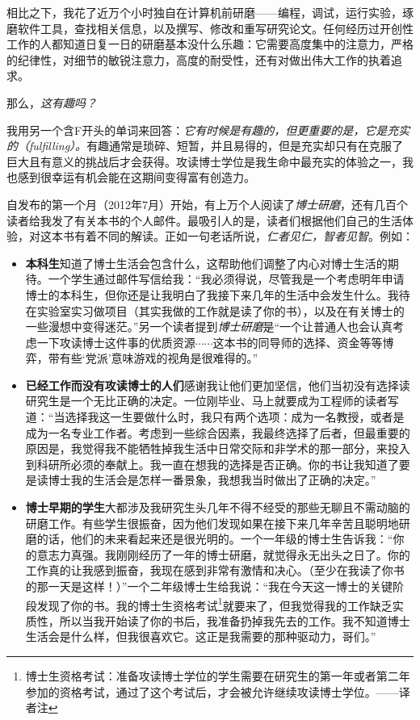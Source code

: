 \documentclass[letter,12pt]{book}
\newcommand{\bookname}{博士研磨}
\begin{document}
\begin{CJK}{UTF8}{gbsn}
相比之下，我花了近万个小时独自在计算机前研磨——编程，调试，运行实验，琢磨软件工具，查找相关信息，以及撰写、修改和重写研究论文。任何经历过开创性工作的人都知道日复一日的研磨基本没什么乐趣：它需要高度集中的注意力，严格的纪律性，对细节的敏锐注意力，高度的耐受性，还有对做出伟大工作的执着追求。

那么，\emph{这有趣吗？}

我用另一个含F开头的单词来回答：\emph{它有时候是有趣的，但更重要的是，它是充实的（fulfilling）。}有趣通常是琐碎、短暂，并且易得的，但是充实却只有在克服了巨大且有意义的挑战后才会获得。攻读博士学位是我生命中最充实的体验之一，我也感到很幸运有机会能在这期间变得富有创造力。

自发布的第一个月（2012年7月）开始，有上万个人阅读了\emph{\bookname}，还有几百个读者给我发了有关本书的个人邮件。最吸引人的是，读者们根据他们自己的生活体验，对这本书有着不同的解读。正如一句老话所说，\emph{仁者见仁，智者见智}。例如：
\begin{itemize}
  \item \textbf{本科生}知道了博士生活会包含什么，这帮助他们调整了内心对博士生活的期待。一个学生通过邮件写信给我：“我必须得说，尽管我是一个考虑明年申请博士的本科生，但你还是让我明白了我接下来几年的生活中会发生什么。我待在实验室实习做项目（其实我做的工作就是读了你的书），以及在有关博士的一些漫想中变得迷茫。”另一个读者提到\emph{\bookname}是“一个让普通人也会认真考虑一下攻读博士这件事的优质资源$\cdots\cdots$这本书的同导师的选择、资金等等博弈，带有些‘党派’意味游戏的视角是很难得的。”
  \item \textbf{已经工作而没有攻读博士的人们}感谢我让他们更加坚信，他们当初没有选择读研究生是一个无比正确的决定。一位刚毕业、马上就要成为工程师的读者写道：“当选择我这一生要做什么时，我只有两个选项：成为一名教授，或者是成为一名专业工作者。考虑到一些综合因素，我最终选择了后者，但最重要的原因是，我觉得我不能牺牲掉我生活中日常交际和非学术的那一部分，来投入到科研所必须的奉献上。我一直在想我的选择是否正确。你的书让我知道了要是读博士我的生活会是怎样一番景象，我想我当时做出了正确的决定。”
  \item \textbf{博士早期的学生}大都涉及我研究生头几年不得不经受的那些无聊且不需动脑的研磨工作。有些学生很振奋，因为他们发现如果在接下来几年辛苦且聪明地研磨的话，他们的未来看起来还是很光明的。一个一年级的博士生告诉我：“你的意志力真强。我刚刚经历了一年的博士研磨，就觉得永无出头之日了。你的工作真的让我感到振奋，我现在感到非常有激情和决心。（至少在我读了你书的那一天是这样！）”一个二年级博士生给我说：“我在今天这一博士的关键阶段发现了你的书。我的博士生资格考试\footnote{博士生资格考试：准备攻读博士学位的学生需要在研究生的第一年或者第二年参加的资格考试，通过了这个考试后，才会被允许继续攻读博士学位。——译者注}就要来了，但我觉得我的工作缺乏实质性，所以当我开始读了你的书后，我准备扔掉我先去的工作。我不知道博士生活会是什么样，但我很喜欢它。这正是我需要的那种驱动力，哥们。”

\end{itemize}
\end{CJK}
\end{document}
